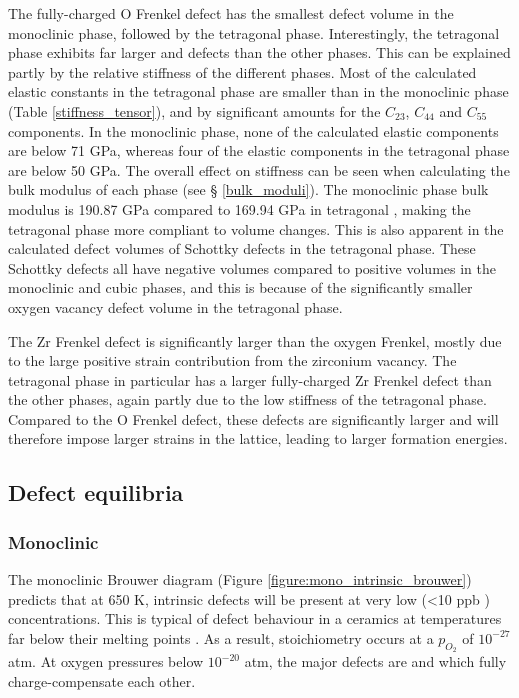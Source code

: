 The fully-charged O Frenkel defect has the smallest defect volume in the monoclinic phase, followed by the tetragonal phase. Interestingly, the tetragonal phase exhibits far larger  and  defects than the other phases. This can be explained partly by the relative stiffness of the different phases. Most of the calculated elastic constants in the tetragonal phase are smaller than in the monoclinic phase (Table \ref{stiffness_tensor}), and by significant amounts for the $C_{23}$, $C_{44}$ and $C_{55}$ components. In the monoclinic phase, none of the calculated elastic components are below 71 GPa, whereas four of the elastic components in the tetragonal phase are below 50 GPa. The overall effect on stiffness can be seen when calculating the bulk modulus of each phase (see § \ref{bulk_moduli}). The monoclinic phase bulk modulus is 190.87 GPa compared to 169.94 GPa in tetragonal \zirconia , making the tetragonal phase more compliant to volume changes. This is also apparent in the calculated defect volumes of Schottky defects in the tetragonal phase. These Schottky defects all have negative volumes compared to positive volumes in the monoclinic and cubic phases, and this is because of the significantly smaller oxygen vacancy defect volume in the tetragonal phase.

The Zr Frenkel defect is significantly larger than the oxygen Frenkel, mostly due to the large positive strain contribution from the zirconium vacancy. The tetragonal phase in particular has a larger fully-charged Zr Frenkel defect than the other phases, again partly due to the low stiffness of the tetragonal phase. Compared to the O Frenkel defect, these defects are significantly larger and will therefore impose larger strains in the lattice, leading to larger formation energies. 

\subsection{Defect equilibria} \label{brouwer_discussion_intrinsic}

\subsubsection*{Monoclinic}

The monoclinic Brouwer diagram (Figure \ref{figure:mono_intrinsic_brouwer}) predicts that at 650 K, intrinsic defects will be present at very low (\textless 10 ppb \zirconia ) concentrations. This is typical of defect behaviour in a ceramics at temperatures far below their melting points \cite{kingery1997physical,ball2006computer}. As a result, stoichiometry occurs at a $p_{O_{2}}$ of $10^{-27}$ atm. At oxygen pressures below $10^{-20}$ atm, the major defects are  and  which fully charge-compensate each other. 

